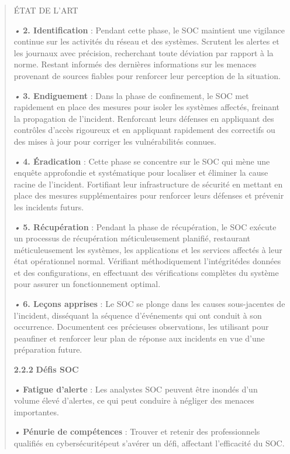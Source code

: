 \documentclass[
]{article}
\begin{document}
\begin{quote}
ÉTAT DE L'ART

\emph{•} \textbf{2. Identification} : Pendant cette phase, le SOC
maintient une vigilance continue sur les activités du réseau et des
systèmes. Scrutent les alertes et les journaux avec précision,
recherchant toute déviation par rapport à la norme. Restant informés des
dernières informations sur les menaces provenant de sources fiables pour
renforcer leur perception de la situation.

\emph{•} \textbf{3. Endiguement} : Dans la phase de confinement, le SOC
met rapidement en place des mesures pour isoler les systèmes affectés,
freinant la propagation de l'incident. Renforcant leurs défenses en
appliquant des contrôles d'accès rigoureux et en appliquant rapidement
des correctifs ou des mises à jour pour corriger les vulnérabilités
connues.

\emph{•} \textbf{4. Éradication} : Cette phase se concentre sur le SOC
qui mène une enquête approfondie et systématique pour localiser et
éliminer la cause racine de l'incident. Fortifiant leur infrastructure
de sécurité en mettant en place des mesures supplémentaires pour
renforcer leurs défenses et prévenir les incidents futurs.

\emph{•} \textbf{5. Récupération} : Pendant la phase de récupération, le
SOC exécute un processus de récupération méticuleusement planifié,
restaurant méticuleusement les systèmes, les applications et les
services affectés à leur état opérationnel normal. Vérifiant
méthodiquement l'intégritédes données et des configurations, en
effectuant des vérifications complètes du système pour assurer un
fonctionnement optimal.

\emph{•} \textbf{6. Leçons apprises} : Le SOC se plonge dans les causes
sous-jacentes de l'incident, disséquant la séquence d'événements qui ont
conduit à son occurrence. Documentent ces précieuses observations, les
utilisant pour peaufiner et renforcer leur plan de réponse aux incidents
en vue d'une préparation future.

\textbf{2.2.2} \textbf{Défis SOC}

\emph{•} \textbf{Fatigue d'alerte} : Les analystes SOC peuvent être
inondés d'un volume élevé d'alertes, ce qui peut conduire à négliger des
menaces importantes.

\emph{•} \textbf{Pénurie de compétences} : Trouver et retenir des
professionnels qualifiés en cybersécuritépeut s'avérer un défi,
affectant l'efficacité du SOC.
\end{quote}
\end{document}
